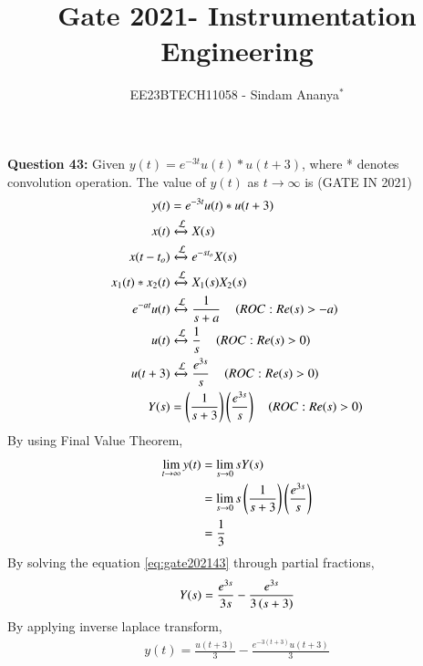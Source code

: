 \documentclass[journal,12pt,twocolumn]{IEEEtran}
\theoremstyle{remark}
\begin{document}

\vspace{3cm}

\title{Gate 2021- Instrumentation Engineering}
\author{EE23BTECH11058 - Sindam Ananya$^{*}$%
}
\maketitle
\newpage
\bigskip

\renewcommand{\thefigure}{\theenumi}
\renewcommand{\thetable}{\theenumi}

\vspace{3cm}
\textbf{Question 43:} 
Given $y(t) = e^{-3t}u(t) * u(t+3)$, where * denotes convolution operation. The value of $y(t)$ as $t \rightarrow \infty$ is
\hfill{(GATE IN 2021)}\\
\solution
\fi
\begin{align}
y(t) &=  e^{-3t}u(t) * u(t+3)\\
x(t) &\xleftrightarrow{\mathcal{L}} X(s)\\
x(t-t_o) &\xleftrightarrow{\mathcal{L}} e^{-s t_o}X(s)\\
x_1(t) * x_2(t) &\xleftrightarrow{\mathcal{L}} X_1(s)X_2(s)\\
e^{-at}u(t) &\xleftrightarrow{\mathcal{L}} \frac{1}{s + a} \quad \left(ROC:Re(s)>-a\right)\\
u(t) &\xleftrightarrow{\mathcal{L}} \frac{1}{s} \quad \left(ROC:Re(s)>0\right)\\
u(t+3) &\xleftrightarrow{\mathcal{L}} \frac{e^{3s}}{s} \quad \left(ROC:Re(s)>0\right)\\ 
Y(s) &= \left(\frac{1}{s + 3}\right)\left(\frac{e^{3s}}{s}\right) \quad \left(ROC:Re(s)>0\right)
\label{eq:gate202143}
\end{align}
By using Final Value Theorem,
\begin{align}
\lim\limits_{t \to \infty} y(t) &= \lim\limits_{s \to 0} sY(s)\\
                                &= \lim\limits_{s \to 0} s\left(\frac{1}{s + 3}\right)\left(\frac{e^{3s}}{s}\right)\\
                                &= \frac{1}{3}
\end{align}
By solving the equation \eqref{eq:gate202143} through partial fractions,
\begin{align}
Y(s) = \frac{e^{3s}}{3s} - \frac{e^{3s}}{3\left(s+3\right)} 
\end{align}
By applying inverse laplace transform,
\begin{align}
y(t) = \frac{u(t+3)}{3} - \frac{e^{-3(t+3)}u(t+3)}{3}
\end{align}
\end{document}
